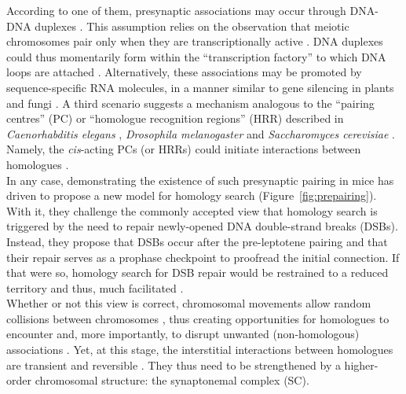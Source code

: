 According to one of them, presynaptic associations may occur through DNA-DNA duplexes \citep{danilowicz2009single}. 
This assumption relies on the observation that meiotic chromosomes pair only when they are transcriptionally active \citep{cook1997transcriptional}. 
DNA duplexes could thus momentarily form within the “transcription factory” to which DNA loops are attached \citep{xu2008similar}.
Alternatively, these associations may be promoted by sequence-specific RNA molecules, in a manner similar to gene silencing in plants and fungi \citep[cited in \citealp{zickler2006early}]{bender2004dna}.
A third scenario suggests a mechanism analogous to the “pairing centres” (PC) or “homologue recognition regions” (HRR) described in \textit{Caenorhabditis elegans} \citep{villeneuve1994cis,macqueen2005chromosome}, \textit{Drosophila melanogaster} \citep{mckee1996license} and \textit{Saccharomyces cerevisiae} \citep{kemp2004role}.
Namely, the \textit{cis}-acting PCs (or HRRs) could initiate interactions between homologues \citep{gerton2005homologous}.\\


In any case, demonstrating the existence of such presynaptic pairing in mice has driven \citet{boateng2013homologous} to propose a new model for homology search (Figure~\ref{fig:prepairing}).
With it, they challenge the commonly accepted view that homology search is triggered by the need to repair newly-opened DNA double-strand breaks (DSBs).
Instead, they propose that DSBs occur after the pre-leptotene pairing and that their repair serves as a prophase checkpoint to proofread the initial connection.
If that were so, homology search for DSB repair would be restrained to a reduced territory and thus, much facilitated \citep{barzel2008finding,mirny2011fractal}.\\

Whether or not this view is correct, chromosomal movements allow random collisions between chromosomes \citep{fung1998homologous}, thus creating opportunities for homologues to encounter and, more importantly, to disrupt unwanted (non-homologous) associations \citep{koszul2009dynamic}.
Yet, at this stage, the interstitial interactions between homologues are transient and reversible \citep{boateng2013homologous}.
They thus need to be strengthened by a higher-order chromosomal structure: the synaptonemal complex (SC).



